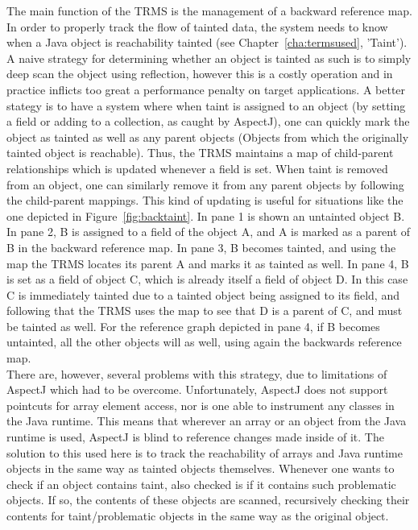 \documentclass[msc,oneside]{ubcthesis}
\begin{document}
The main function of the TRMS is the management of a backward reference map. In order to properly track the flow of tainted data, the system needs to know when a Java object is reachability tainted (see Chapter~\ref{cha:termsused}, 'Taint'). A naive strategy for determining whether an object is tainted as such is to simply deep scan the object using reflection, however this is a costly operation and in practice inflicts too great a performance penalty on target applications. A better stategy is to have a system where when taint is assigned to an object (by setting a field or adding to a collection, as caught by AspectJ), one can quickly mark the object as tainted as well as any parent objects (Objects from which the originally tainted object is reachable). Thus, the TRMS maintains a map of child-parent relationships which is updated whenever a field is set. When taint is removed from an object, one can similarly remove it from any parent objects by following the child-parent mappings. This kind of updating is useful for situations like the one depicted in Figure~\ref{fig:backtaint}. In pane 1 is shown an untainted object B. In pane 2, B is assigned to a field of the object A, and A is marked as a parent of B in the backward reference map. In pane 3, B becomes tainted, and using the map the TRMS locates its parent A and marks it as tainted as well. In pane 4, B is set as a field of object C, which is already itself a field of object D. In this case C is immediately tainted due to a tainted object being assigned to its field, and following that the TRMS uses the map to see that D is a parent of C, and must be tainted as well. For the reference graph depicted in pane 4, if B becomes untainted, all the other objects will as well, using again the backwards reference map.\\

There are, however, several problems with this strategy, due to limitations of AspectJ which had to be overcome. Unfortunately, AspectJ does not support pointcuts for array element access, nor is one able to instrument any classes in the Java runtime. This means that wherever an array or an object from the Java runtime is used, AspectJ is blind to reference changes made inside of it. The solution to this used here is to track the reachability of arrays and Java runtime objects in the same way as tainted objects themselves. Whenever one wants to check if an object contains taint, also checked is if it contains such problematic objects. If so, the contents of these objects are scanned, recursively checking their contents for taint/problematic objects in the same way as the original object.\\
\end{document}
